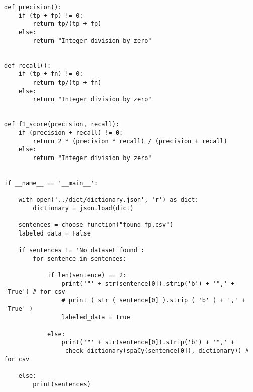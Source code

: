 \begin{lstlisting}[language=iPython]
def precision():
	if (tp + fp) != 0:
		return tp/(tp + fp)
	else:
		return "Integer division by zero"


def recall():
	if (tp + fn) != 0:
		return tp/(tp + fn)
	else:
		return "Integer division by zero"


def f1_score(precision, recall):
	if (precision + recall) != 0:
		return 2 * (precision * recall) / (precision + recall)
	else:
		return "Integer division by zero"


if __name__ == '__main__':

	with open('../dict/dictionary.json', 'r') as dict:
		dictionary = json.load(dict)
	
	sentences = choose_function("found_fp.csv")
	labeled_data = False
	
	if sentences != 'No dataset found':
        for sentence in sentences:

			if len(sentence) == 2:
				print('"' + str(sentence[0]).strip('b') + '",' + 'True') # for csv
				# print ( str ( sentence[0] ).strip ( 'b' ) + ',' + 'True' )
				labeled_data = True
				
			else:
				print('"' + str(sentence[0]).strip('b') + '",' + 
				 check_dictionary(spaCy(sentence[0]), dictionary)) # for csv
	
	else:
		print(sentences)
\end{lstlisting}
